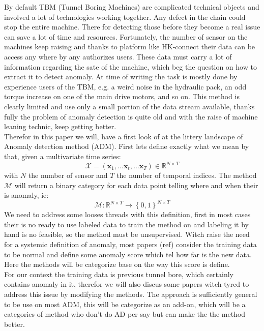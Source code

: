 \documentclass[../../main/main.tex]{subfiles}
\begin{document}

    By default TBM (Tunnel Boring Machines) are complicated technical objects and involved 
    a lot of technologies working together. Any defect in the chain could stop the entire machine. There for detecting those 
    before they become a real issue can save a lot of time and resources. Fortunately, the number of sensor on the machines keep raising 
    and thanks to platform like HK-connect their data can be access any where by any authorizes users. These data must carry a lot of information 
    regarding the sate of the machine, which beg the question on how to extract it to detect anomaly. At time of writing the task is mostly done
    by experience users of the TBM, e.g. a weird noise in the hydraulic pack, an odd torque increase on one of the
    main drive motors, and so on. This method is clearly limited and use only a small portion of the data stream available, thanks fully the 
    problem of anomaly detection is quite old and with the raise of machine leaning technic, keep getting better. \\
    Therefor in this paper we will, have a first look of at the littery landscape of Anomaly detection method (ADM).
    First lets define exactly what we mean by that, given a multivariate time series: 
    \[\mathcal{X} = (\textbf{x}_1, \dots \textbf{x}_t, \dots \textbf{x}_T) \in \mathbb{R}^{N \times T}\]
    with $N$ the number of sensor and $T$ the number of temporal indices. The method $\mathcal{M} $ will return a binary category for each data point 
    telling where and when their is anomaly, ie:
    \[\mathcal{M} : \mathbb{R}^{N \times T} \to \left\{0, 1\right\} ^{N \times T}\]
    We need to address some looses threads with this definition, first in most cases their is no ready to use labeled data to train the method on
    and labeling it by hand is no feasible, so the method must be unsupervised. Witch raise the need for a systemic definition of anomaly, 
    most papers (ref) consider the training data to be normal and define some anomaly score which tel how far is the new data. Here the methods will 
    be categorize base on the way this score is define.\\
    For our context the training data is previous tunnel bore, which certainly contains anomaly in it, therefor we will also discus some 
    papers witch tyred to address this issue by modifying the methods. The approach is sufficiently general to be use on most ADM, this will
    be categorize as an add-on, which will be a categories of method who don't do AD per say but can make the the method better. 
\end{document}
